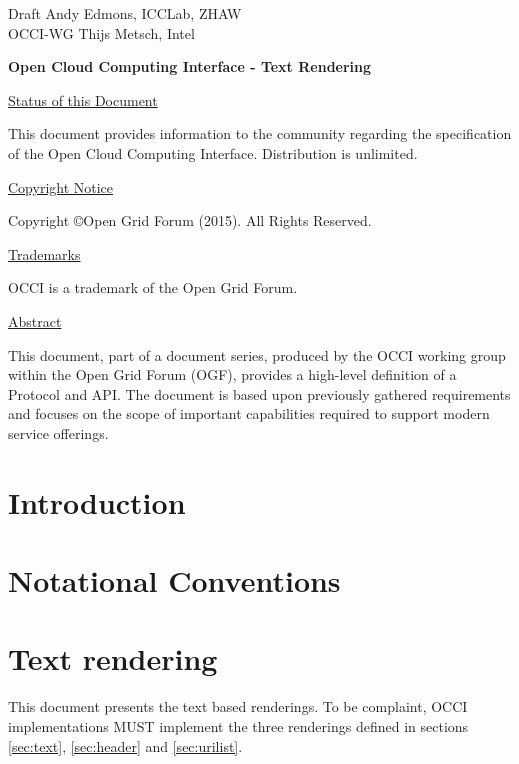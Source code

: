 \documentclass[10pt,a4paper]{article}
\begin{document}
\thispagestyle{empty}

Draft \hfill Andy Edmons, ICCLab, ZHAW \\
OCCI-WG \hfill Thijs Metsch, Intel\\
\rightline {\today}

\vspace*{0.5in}

\begin{Large}
\textbf{Open Cloud Computing Interface - Text Rendering}
\end{Large}

\vspace*{0.5in}

\underline{Status of this Document}

This document provides information to the community regarding the
specification of the Open Cloud Computing Interface. Distribution is
unlimited.

\underline{Copyright Notice}

Copyright \copyright Open Grid Forum (2015). All Rights Reserved.

\underline{Trademarks}

OCCI is a trademark of the Open Grid Forum.

\underline{Abstract}

This document, part of a document series, produced by the OCCI working
group within the Open Grid Forum (OGF), provides a high-level
definition of a Protocol and API. The document is based upon
previously gathered requirements and focuses on the scope of important
capabilities required to support modern service offerings.

\newpage
\tableofcontents
\newpage

\section{Introduction}


\section{Notational Conventions}


\section{Text rendering}

This document presents the text based renderings. To be complaint, OCCI implementations MUST implement the three renderings defined in sections \ref{sec:text}, \ref{sec:header} and \ref{sec:urilist}.
\end{document}
